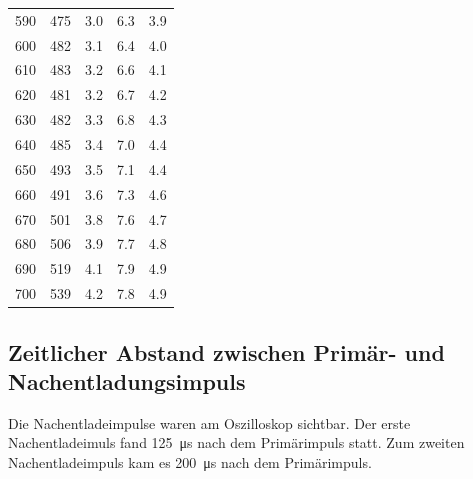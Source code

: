\documentclass[
  bibliography=totoc,     %
  captions=tableheading,  %
  titlepage=firstiscover, %
]{scrartcl}
\begin{document}
\begin{table}
\begin{tabular}{S[table-format=3.0] S[table-format=3.0] S S S}
    590 & 475 & 3.0 & 6.3 & 3.9 \\
    600 & 482 & 3.1 & 6.4 & 4.0 \\
    610 & 483 & 3.2 & 6.6 & 4.1 \\
    620 & 481 & 3.2 & 6.7 & 4.2 \\
    630 & 482 & 3.3 & 6.8 & 4.3 \\
    640 & 485 & 3.4 & 7.0 & 4.4 \\
    650 & 493 & 3.5 & 7.1 & 4.4 \\
    660 & 491 & 3.6 & 7.3 & 4.6 \\
    670 & 501 & 3.8 & 7.6 & 4.7 \\
    680 & 506 & 3.9 & 7.7 & 4.8 \\
    690 & 519 & 4.1 & 7.9 & 4.9 \\
    700 & 539 & 4.2 & 7.8 & 4.9 \\
    \bottomrule
  \end{tabular}
\end{table}
\clearpage
\subsection{Zeitlicher Abstand zwischen Primär- und Nachentladungsimpuls}
Die Nachentladeimpulse waren am Oszilloskop sichtbar.
Der erste Nachentladeimuls fand \SI{125}{\micro\second} nach dem Primärimpuls
statt. Zum zweiten Nachentladeimpuls kam es \SI{200}{\micro\second} nach dem
Primärimpuls.
\end{document}

